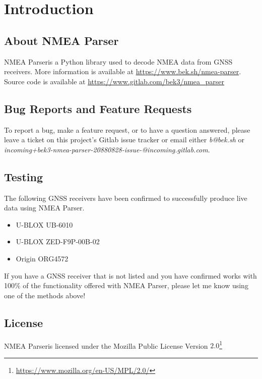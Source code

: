 \documentclass{report} %
\title{\projname \version}
\author{Brendan Kristiansen}
\date{Compiled on \today}
\newcommand{\projname}{NMEA Parser}
\begin{document}
\maketitle
\tableofcontents

\chapter{Introduction}

\section{About NMEA Parser}

\projname is a Python library used to decode NMEA data from GNSS receivers.
More information is available at \url{https://www.bek.sh/nmea-parser}.
Source code is available at \url{https://www.gitlab.com/bek3/nmea_parser}

\section{Bug Reports and Feature Requests}

To report a bug, make a feature request, or to have a question answered, please leave a ticket on this
project's Gitlab issue tracker or email either \emph{b@bek.sh} or
\emph{incoming+bek3-nmea-parser-20880828-issue-@incoming.gitlab.com}.

\section{Testing}

The following GNSS receivers have been confirmed to successfully produce live data using \projname.

\begin{itemize}
	\item U-BLOX UB-6010 
	\item U-BLOX ZED-F9P-00B-02
	\item Origin ORG4572
\end{itemize}

If you have a GNSS receiver that is not listed and you have confirmed works with 100\% of the
functionality offered with \projname, please let me know using one of the methods above!

\section{License}
\projname is licensed under the Mozilla Public License Version $2.0$\footnote{\url{https://www.mozilla.org/en-US/MPL/2.0/}}
\end{document}
